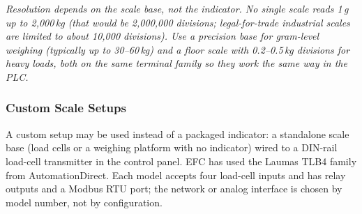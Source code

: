 \textit{\small Resolution depends on the scale base, not the indicator. No single scale reads 1\,g up to 2,000\,kg (that would be 2,000,000 divisions; legal-for-trade industrial scales are limited to about 10,000 divisions). Use a precision base for gram-level weighing (typically up to 30--60\,kg) and a floor scale with 0.2--0.5\,kg divisions for heavy loads, both on the same terminal family so they work the same way in the PLC.}

\subsubsection*{Custom Scale Setups}
A custom setup may be used instead of a packaged indicator: a standalone scale base (load cells or a weighing platform with no indicator) wired to a DIN-rail load-cell transmitter in the control panel. EFC has used the Laumas TLB4 family from AutomationDirect. Each model accepts four load-cell inputs and has relay outputs and a Modbus RTU port; the network or analog interface is chosen by model number, not by configuration.

